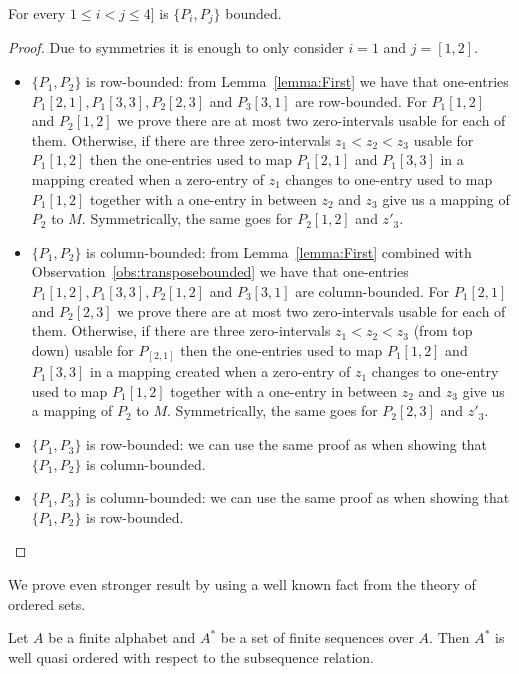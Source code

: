 \begin{thm}
For every $1\leq i<j\leq4]$ is $\{P_i,P_j\}$ bounded.
\end{thm}
\begin{proof}
Due to symmetries it is enough to only consider $i=1$ and $j=[1,2]$.

\begin{itemize}
	\item $\{P_1,P_2\}$ is row-bounded: from Lemma~\ref{lemma:First} we have that one-entries $P_1[2,1],P_1[3,3],P_2[2,3]$ and $P_3[3,1]$ are row-bounded. For $P_1[1,2]$ and $P_2[1,2]$ we prove there are at most two zero-intervals usable for each of them. Otherwise, if there are three zero-intervals $z_1<z_2<z_3$ usable for $P_1[1,2]$ then the one-entries used to map $P_1[2,1]$ and $P_1[3,3]$ in a mapping created when a zero-entry of $z_1$ changes to one-entry used to map $P_1[1,2]$ together with a one-entry in between $z_2$ and $z_3$ give us a mapping of $P_2$ to $M$. Symmetrically, the same goes for $P_2[1,2]$ and $z'_3$.
	\item $\{P_1,P_2\}$ is column-bounded: from Lemma~\ref{lemma:First} combined with Observation~\ref{obs:transposebounded} we have that one-entries $P_1[1,2],P_1[3,3],P_2[1,2]$ and $P_3[3,1]$ are column-bounded. For $P_1[2,1]$ and $P_2[2,3]$ we prove there are at most two zero-intervals usable for each of them. Otherwise, if there are three zero-intervals $z_1<z_2<z_3$ (from top down) usable for $P_[2,1]$ then the one-entries used to map $P_1[1,2]$ and $P_1[3,3]$ in a mapping created when a zero-entry of $z_1$ changes to one-entry used to map $P_1[1,2]$ together with a one-entry in between $z_2$ and $z_3$ give us a mapping of $P_2$ to $M$. Symmetrically, the same goes for $P_2[2,3]$ and $z'_3$.
	\item $\{P_1,P_3\}$ is row-bounded: we can use the same proof as when showing that $\{P_1,P_2\}$ is column-bounded.
	\item $\{P_1,P_3\}$ is column-bounded: we can use the same proof as when showing that $\{P_1,P_2\}$ is row-bounded.
\end{itemize}
\end{proof}

We prove even stronger result by using a well known fact from the theory of ordered sets.

\begin{fct}
\label{fct:Higman}
Let $A$ be a finite alphabet and $A^*$ be a set of finite sequences over $A$. Then $A^*$ is well quasi ordered with respect to the subsequence relation.
\end{fct}


